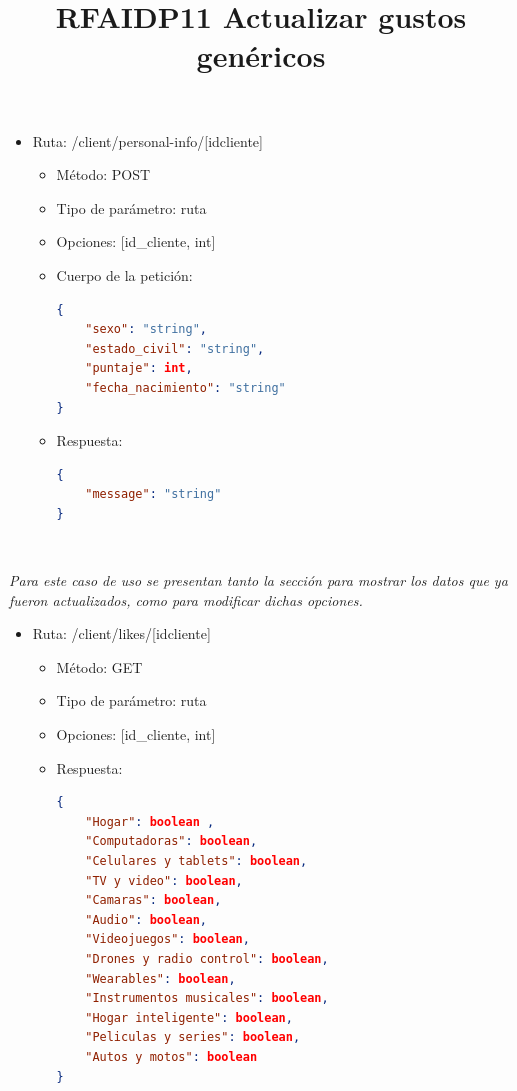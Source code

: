 \begin{itemize}
\item Ruta: /client/personal-info/[idcliente]
\begin{itemize}
\item Método: POST
\item Tipo de parámetro: ruta
\item Opciones: [id\_cliente, int]
\item Cuerpo de la petición:
\begin{lstlisting}[language=json,firstnumber=1]
{
	"sexo": "string",
	"estado_civil": "string",
	"puntaje": int,
	"fecha_nacimiento": "string"
}
\end{lstlisting}
\item Respuesta: 
\begin{lstlisting}[language=json,firstnumber=1]
{
    "message": "string"
}
\end{lstlisting}
\end{itemize}
\end{itemize}

\title{\textbf{RFAIDP11 Actualizar gustos genéricos}}
\\ \par
\textit{Para este caso de uso se presentan tanto la sección para mostrar los datos que ya fueron actualizados, como para modificar dichas opciones.}
\begin{itemize}
\item Ruta: /client/likes/[idcliente]
\begin{itemize}
\item Método: GET
\item Tipo de parámetro: ruta
\item Opciones: [id\_cliente, int]
\item Respuesta: 
\begin{lstlisting}[language=json,firstnumber=1]
{
	"Hogar": boolean ,
	"Computadoras": boolean,
	"Celulares y tablets": boolean,
	"TV y video": boolean,
	"Camaras": boolean,
	"Audio": boolean,
	"Videojuegos": boolean, 
	"Drones y radio control": boolean,
	"Wearables": boolean,
	"Instrumentos musicales": boolean,
	"Hogar inteligente": boolean,
	"Peliculas y series": boolean,
	"Autos y motos": boolean
}
\end{lstlisting}
\end{itemize}
\end{itemize}

